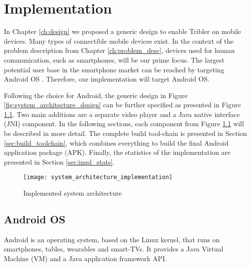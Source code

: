 \chapter{Implementation}\label{ch:implementation}

In Chapter \ref{ch:design} we proposed a generic design to enable Tribler on mobile devices.
Many types of connectible mobile devices exist.
In the context of the problem description from Chapter \ref{ch:problem_desc}, devices used for human communication, such as smartphones, will be our prime focus.
The largest potential user base in the smartphone market can be reached by targeting Android OS \cite{smartphone-os}.
Therefore, our implementation will target Android OS.

Following the choice for Android, the generic design in Figure \ref{fig:system_architecture_design} can be further specified as presented in Figure \ref{fig:system_architecture_implementation}.
Two main additions are a separate video player and a Java native interface (JNI) component.
In the following sections, each component from Figure \ref{fig:system_architecture_implementation} will be described in more detail.
The complete build tool-chain is presented in Section \ref{sec:build_toolchain}, which combines everything to build the final Android application package (APK).
Finally, the statistics of the implementation are presented in Section \ref{sec:impl_stats}.

\begin{figure}[H]
	\centering
	\texttt{[image: system\_architecture\_implementation]}
	\caption{Implemented system architecture}
	\label{fig:system_architecture_implementation}
\end{figure}


\section{Android OS}
Android is an operating system, based on the Linux kernel, that runs on smartphones, tables, wearables and smart-TVs.
It provides a Java Virtual Machine (VM) and a Java application framework API.

